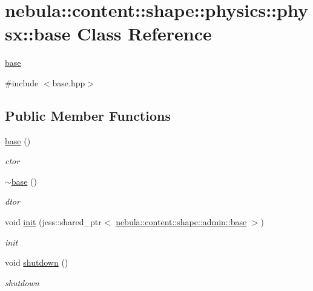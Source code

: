 \hypertarget{classnebula_1_1content_1_1shape_1_1physics_1_1physx_1_1base}{
\section{nebula::content::shape::physics::physx::base Class Reference}
\label{classnebula_1_1content_1_1shape_1_1physics_1_1physx_1_1base}
}


\hyperlink{classnebula_1_1content_1_1shape_1_1physics_1_1physx_1_1base}{base}  


{\ttfamily \#include $<$base.hpp$>$}\subsection*{Public Member Functions}
\begin{DoxyCompactItemize}
\item 
\hyperlink{classnebula_1_1content_1_1shape_1_1physics_1_1physx_1_1base_ac9abb1a1a202a87029a94abe99a7a45b}{base} ()
\begin{DoxyCompactList}\small\item\em ctor \item\end{DoxyCompactList}\item 
\hyperlink{classnebula_1_1content_1_1shape_1_1physics_1_1physx_1_1base_afb35c7a19298a888ca4708a0e8f3891b}{$\sim$base} ()
\begin{DoxyCompactList}\small\item\em dtor \item\end{DoxyCompactList}\item 
void \hyperlink{classnebula_1_1content_1_1shape_1_1physics_1_1physx_1_1base_adb58c357d53d98a575856439b6c30de0}{init} (jess::shared\_\-ptr$<$ \hyperlink{classnebula_1_1content_1_1shape_1_1admin_1_1base}{nebula::content::shape::admin::base} $>$)
\begin{DoxyCompactList}\small\item\em init \item\end{DoxyCompactList}\item 
void \hyperlink{classnebula_1_1content_1_1shape_1_1physics_1_1physx_1_1base_a14492eda26cb649affa5a03d6d771137}{shutdown} ()
\begin{DoxyCompactList}\small\item\em shutdown \item\end{DoxyCompactList}\end{DoxyCompactItemize}


